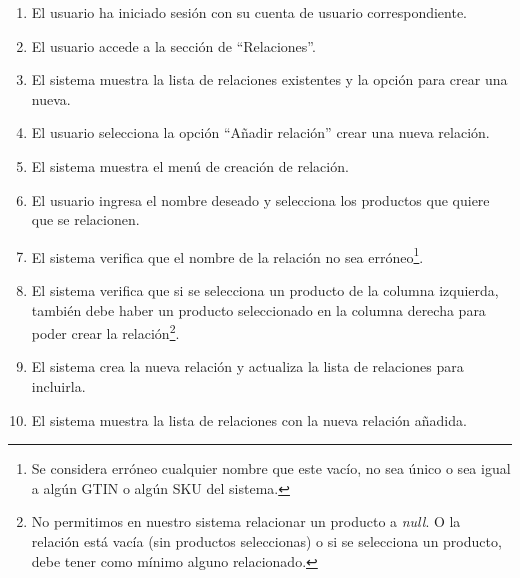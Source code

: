 \begin{enumerate}
    \item El usuario ha iniciado sesión con su cuenta de usuario correspondiente.
    \item El usuario accede a la sección de \enquote{Relaciones}.
    \item El sistema muestra la lista de relaciones existentes y la opción para crear una nueva.
    \item El usuario selecciona la opción \enquote{Añadir relación} crear una nueva relación.
    \item El sistema muestra el menú de creación de relación.
    \item El usuario ingresa el nombre deseado y selecciona los productos que quiere que se relacionen.
    \item El sistema verifica que el nombre de la relación no sea erróneo\footnote{Se considera erróneo cualquier nombre que este vacío, no sea único o sea igual a algún GTIN o algún SKU del sistema.}.
    \item El sistema verifica que si se selecciona un producto de la columna izquierda, también debe haber un producto seleccionado en la columna derecha para poder crear la relación\footnote{No permitimos en nuestro sistema relacionar un producto a \emph{null}. O la relación está vacía (sin productos seleccionas) o si se selecciona un producto, debe tener como mínimo alguno relacionado.}.
    \item El sistema crea la nueva relación y actualiza la lista de relaciones para incluirla.
    \item El sistema muestra la lista de relaciones con la nueva relación añadida.
\end{enumerate}

